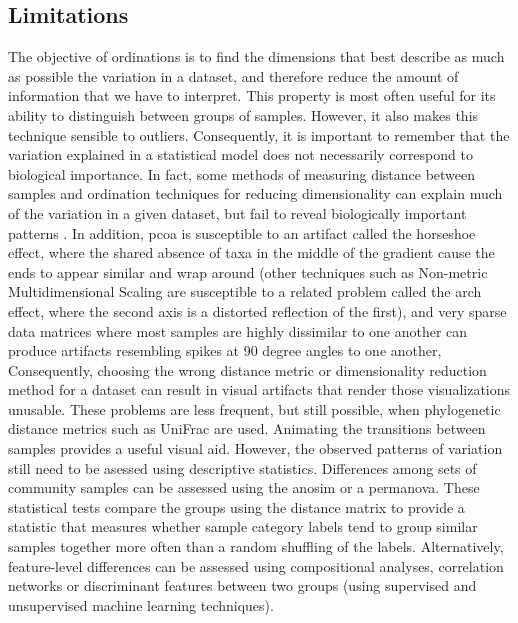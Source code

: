 \subsection{Limitations}
The objective of ordinations is to find the dimensions that best describe as much as possible the variation in a dataset, and therefore reduce the amount of information that we have to interpret. This property is most often useful for its ability to distinguish between groups of samples. However, it also makes this technique sensible to outliers. Consequently, it is important to remember that the variation explained in a statistical model does not necessarily correspond to biological importance. In fact, some methods of measuring distance between samples and ordination techniques for reducing dimensionality can explain much of the variation in a given dataset, but fail to reveal biologically important patterns \cite{RN3802}. In addition, \gls{pcoa} is susceptible to an artifact called the horseshoe effect, where the shared absence of taxa in the middle of the gradient cause the ends to appear similar and wrap around (other techniques such as Non-metric Multidimensional Scaling are susceptible to a related problem called the arch effect, where the second axis is a distorted reflection of the first), and very sparse data matrices where most samples are highly dissimilar to one another can produce artifacts resembling spikes at 90 degree angles to one another, Consequently, choosing the wrong distance metric or dimensionality reduction method for a dataset can result in visual artifacts that render those visualizations unusable. These problems are less frequent, but still possible, when phylogenetic distance metrics such as UniFrac \cite{RN133} are used.
Animating the transitions between samples provides a useful visual aid. However, the observed patterns of variation still need to be asessed using descriptive statistics. Differences among sets of community samples can be assessed using the \gls{anosim} or a \gls{permanova}. These statistical tests compare the groups using the distance matrix to provide a statistic that measures whether sample category labels tend to group similar samples together more often than a random shuffling of the labels. Alternatively, feature-level differences can be assessed using compositional analyses, correlation networks or discriminant features between two groups (using supervised and unsupervised machine learning techniques). 

